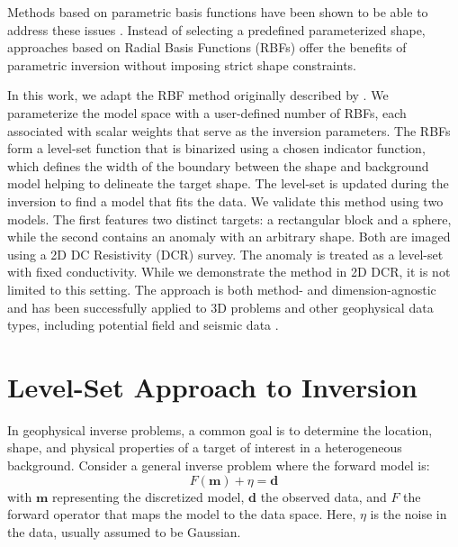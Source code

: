 \documentclass{segabs}
\begin{document}
Methods based on parametric basis functions have been shown to be able to address these issues  \citep{aghasi_parametric_2011,kadu_salt_2017, ozsar_parametric_2025}. Instead of selecting a predefined parameterized shape, approaches based on Radial Basis Functions (RBFs) offer the benefits of parametric inversion without imposing strict shape constraints.

In this work, we adapt the RBF method originally described by \citep{aghasi_parametric_2011}. We parameterize the model space with a user-defined number of RBFs, each associated with scalar weights that serve as the inversion parameters. The RBFs form a level-set function that is binarized using a chosen indicator function, which defines the width of the boundary between the shape and background model helping to delineate the target shape. The level-set is updated during the inversion to find a model that fits the data. We validate this method using two models. The first features two distinct targets: a rectangular block and a sphere, while the second contains an anomaly with an arbitrary shape. Both are imaged using a 2D DC Resistivity (DCR) survey. The anomaly is treated as a level-set with fixed conductivity. While we demonstrate the method in 2D DCR, it is not limited to this setting. The approach is both method- and dimension-agnostic and has been successfully applied to 3D problems and other geophysical data types, including potential field and seismic data \citep{kadu_salt_2017}.

\vspace{-0.45cm}
\section{Level-Set Approach to Inversion}
\vspace{-0.25cm}

In geophysical inverse problems, a common goal is to determine the location, shape, and physical properties of a target of interest in a heterogeneous background. Consider a general inverse problem where the forward model is:
\begin{equation}
	F(\mathbf{m}) + \eta = \mathbf{d}
\end{equation}
with $\mathbf{m}$ representing the discretized model, $\mathbf{d}$ the observed data, and $F$ the forward operator that maps the model to the data space. Here, $\eta$ is the noise in the data, usually assumed to be Gaussian.
\end{document}
